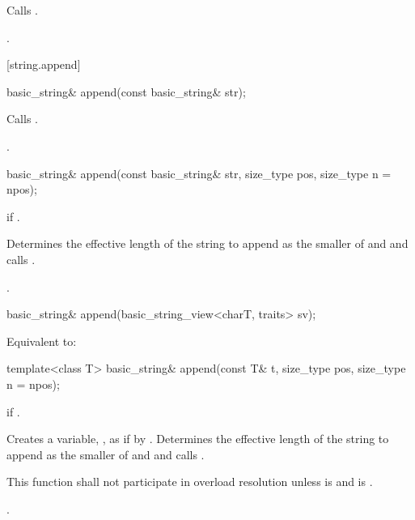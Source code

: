 \begin{itemdescr}
\pnum
\effects Calls .

\pnum
\returns {}.
\end{itemdescr}


[string.append]{}

%
\begin{itemdecl}
basic_string&
  append(const basic_string& str);
\end{itemdecl}

\begin{itemdescr}
\pnum
\effects Calls .

\pnum
\returns
{}.
\end{itemdescr}

%
\begin{itemdecl}
basic_string&
  append(const basic_string& str, size_type pos, size_type n = npos);
\end{itemdecl}

\begin{itemdescr}
\pnum
\throws
{}
if
.

\pnum
\effects
Determines the effective length 
of the string to append as the smaller of  and
 and calls .

\pnum
\returns
{}.
\end{itemdescr}

%
\begin{itemdecl}
basic_string& append(basic_string_view<charT, traits> sv);
\end{itemdecl}

\begin{itemdescr}
\pnum
\effects
Equivalent to: 
\end{itemdescr}

%
\begin{itemdecl}
template<class T>
  basic_string& append(const T& t, size_type pos, size_type n = npos);
\end{itemdecl}

\begin{itemdescr}
\pnum
\throws
{}
if
.

\pnum
\effects
Creates a variable, , as if by .
Determines the effective length  of the string to append
as the smaller of  and 
and calls .

\pnum
\remarks
This function shall not participate in overload resolution
unless 
is  and  is .

\pnum
\returns
{}.
\end{itemdescr}

